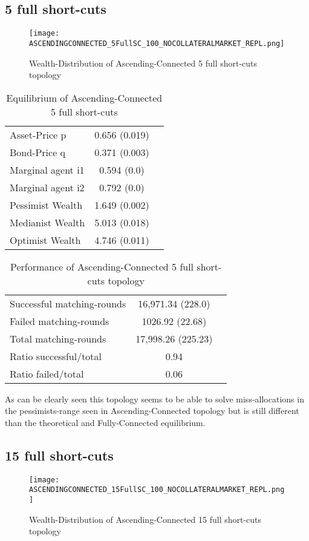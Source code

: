 \documentclass[Bachelorarbeit.tex]{subfiles}
\begin{document}
\subsection{5 full short-cuts}
\begin{figure}[H]
	\centering
  \texttt{[image: ASCENDINGCONNECTED\_5FullSC\_100\_NOCOLLATERALMARKET\_REPL.png]}
	\caption{Wealth-Distribution of Ascending-Connected 5 full short-cuts topology}
	\label{fig:wealth_ASCENDINGCONNECTED_5FullSC_100_NOCOLLATERALMARKET_REPL}
\end{figure}

\begin{table}[H]
	\caption{Equilibrium of Ascending-Connected 5 full short-cuts}
	\centering
	\begin{tabular} { l c r }
		\hline
		Asset-Price p & 0.656 (0.019) \\
		Bond-Price q & 0.371 (0.003) \\
		Marginal agent i1 & 0.594 (0.0) \\
		Marginal agent i2 & 0.792 (0.0) \\
		\hline
		Pessimist Wealth & 1.649 (0.002) \\
		Medianist Wealth & 5.013 (0.018) \\
		Optimist Wealth & 4.746 (0.011) \\
		\hline
	\end{tabular}
\end{table} 

\begin{table}[H]
	\caption{Performance of Ascending-Connected 5 full short-cuts topology}
	\centering
	\begin{tabular} { l c r }
		\hline
		Successful matching-rounds& 16,971.34 (228.0) \\
		Failed matching-rounds & 1026.92 (22.68) \\
		Total matching-rounds & 17,998.26 (225.23) \\
		\hline
		Ratio successful/total & 0.94 \\
		Ratio failed/total & 0.06 \\
		\hline
	\end{tabular}
\end{table}

As can be clearly seen this topology seems to be able to solve miss-allocations in the pessimists-range seen in Ascending-Connected topology but is still different than the theoretical and Fully-Connected equilibrium.

\subsection{15 full short-cuts}
\begin{figure}[H]
	\centering
  \texttt{[image: ASCENDINGCONNECTED\_15FullSC\_100\_NOCOLLATERALMARKET\_REPL.png]}
	\caption{Wealth-Distribution of Ascending-Connected 15 full short-cuts topology}
	\label{fig:wealth_ASCENDINGCONNECTED_15FullSC_100_NOCOLLATERALMARKET_REPL}
\end{figure}
\end{document}
